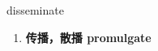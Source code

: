 
\begin{frame}
{\huge disseminate}
\begin{center}
\begin{enumerate}\Large
  \item \textbf{传播，散播 promulgate}
\end{enumerate}
\end{center}
\end{frame}
